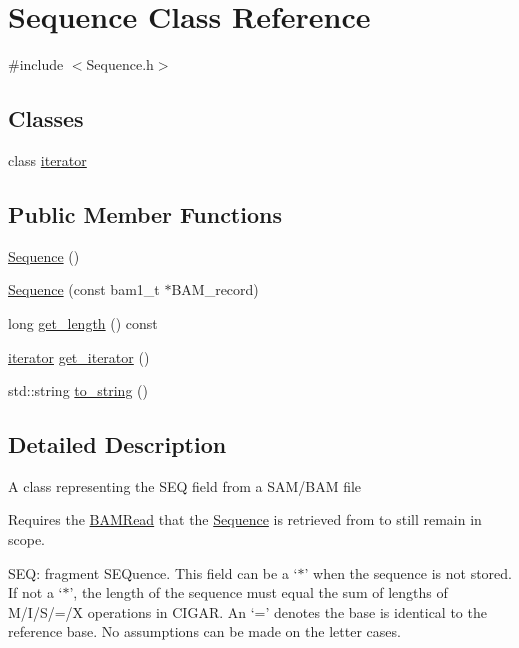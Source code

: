 \hypertarget{class_sequence}{
\section{Sequence Class Reference}
\label{class_sequence}
}


{\ttfamily \#include $<$Sequence.h$>$}

\subsection*{Classes}
\begin{DoxyCompactItemize}
\item 
class \hyperlink{class_sequence_1_1iterator}{iterator}
\end{DoxyCompactItemize}
\subsection*{Public Member Functions}
\begin{DoxyCompactItemize}
\item 
\hyperlink{class_sequence_a532b7e8df6ff6b2f990c14ae97859ca2}{Sequence} ()
\item 
\hyperlink{class_sequence_a4396b10c88a28e86858dc2389d75df53}{Sequence} (const bam1\_\-t $\ast$BAM\_\-record)
\item 
long \hyperlink{class_sequence_a7f101854a09dd48866a747d64282e6c7}{get\_\-length} () const 
\item 
\hyperlink{class_sequence_1_1iterator}{iterator} \hyperlink{class_sequence_a308e9325008e8f1e5f665555b0c2932f}{get\_\-iterator} ()
\item 
std::string \hyperlink{class_sequence_a4644cbc2d0760970dacaac8a29f095a7}{to\_\-string} ()
\end{DoxyCompactItemize}


\subsection{Detailed Description}
A class representing the SEQ field from a SAM/BAM file

Requires the \hyperlink{class_b_a_m_read}{BAMRead} that the \hyperlink{class_sequence}{Sequence} is retrieved from to still remain in scope.

SEQ: fragment SEQuence. This field can be a `$\ast$' when the sequence is not stored. If not a `$\ast$', the length of the sequence must equal the sum of lengths of M/I/S/=/X operations in CIGAR. An `=' denotes the base is identical to the reference base. No assumptions can be made on the letter cases. 

